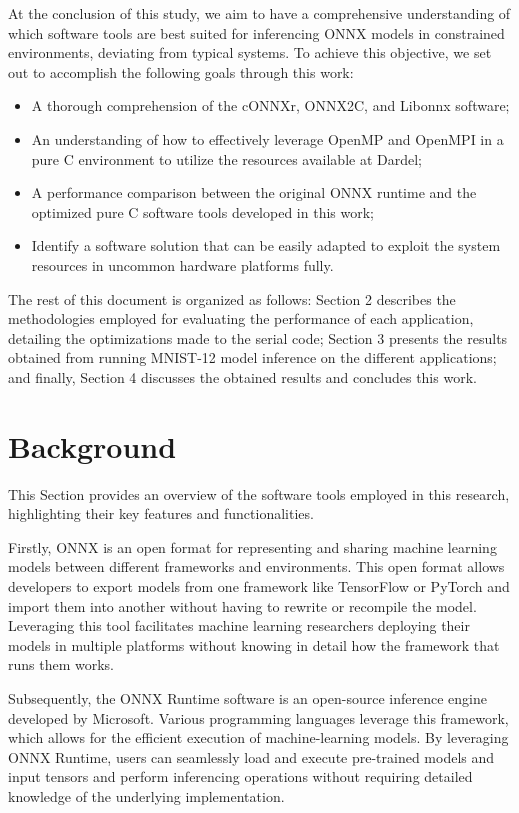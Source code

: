 \documentclass[fleqn,10pt]{olplainarticle}
\begin{document}
At the conclusion of this study, we aim to have a comprehensive understanding of which software tools are best suited for inferencing ONNX models in constrained environments, deviating from typical systems. To achieve this objective, we set out to accomplish the following goals through this work:
\begin{itemize}
    \item A thorough comprehension of the cONNXr, ONNX2C, and Libonnx software;
    \item An understanding of how to effectively leverage OpenMP and OpenMPI in a pure C environment to utilize the resources available at Dardel;
    \item A performance comparison between the original ONNX runtime and the optimized pure C software tools developed in this work;
    \item Identify a software solution that can be easily adapted to exploit the system resources in uncommon hardware platforms fully. 
\end{itemize}

The rest of this document is organized as follows: Section 2 describes the methodologies employed for evaluating the performance of each application, detailing the optimizations made to the serial code; Section 3 presents the results obtained from running MNIST-12 model inference on the different applications; and finally, Section 4 discusses the obtained results and concludes this work.

\section{Background}
This Section provides an overview of the software tools employed in this research, highlighting their key features and functionalities.

Firstly, ONNX is an open format for representing and sharing machine learning models between different frameworks and environments. This open format allows developers to export models from one framework like TensorFlow \cite{martinabadiTensorFlowLargescaleMachine2015} or PyTorch \cite{paszkePyTorchImperativeStyle2019} and import them into another without having to rewrite or recompile the model. Leveraging this tool facilitates machine learning researchers deploying their models in multiple platforms without knowing in detail how the framework that runs them works.

Subsequently, the ONNX Runtime software is an open-source inference engine developed by Microsoft. Various programming languages leverage this framework, which allows for the efficient execution of machine-learning models. By leveraging ONNX Runtime, users can seamlessly load and execute pre-trained models and input tensors and perform inferencing operations without requiring detailed knowledge of the underlying implementation.
\end{document}
